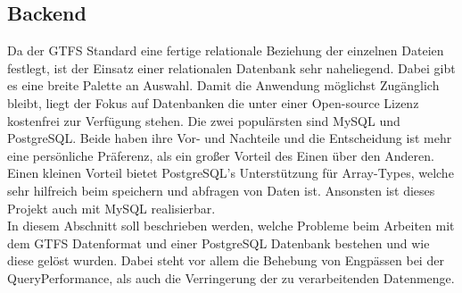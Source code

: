\subsection{Backend}
\label{sub:backend}
  Da der GTFS Standard eine fertige relationale Beziehung der einzelnen Dateien festlegt, ist der Einsatz einer relationalen Datenbank sehr naheliegend. Dabei gibt es eine breite Palette an Auswahl. Damit die Anwendung möglichst Zugänglich bleibt, liegt der Fokus auf Datenbanken die unter einer Open-source Lizenz kostenfrei zur Verfügung stehen. Die zwei populärsten sind MySQL und PostgreSQL\parencite{db_engines}. Beide haben ihre Vor- und Nachteile und die Entscheidung ist mehr eine persönliche Präferenz, als ein großer Vorteil des Einen über den Anderen. Einen kleinen Vorteil bietet PostgreSQL's Unterstützung für Array-Types, welche sehr hilfreich beim speichern und abfragen von Daten ist. Ansonsten ist dieses Projekt auch mit MySQL realisierbar.\\

  In diesem Abschnitt soll beschrieben werden, welche Probleme beim Arbeiten mit dem GTFS Datenformat und einer PostgreSQL Datenbank bestehen und wie diese gelöst wurden. Dabei steht vor allem die Behebung von Engpässen bei der Query\footnotemark Performance, als auch die Verringerung der zu verarbeitenden Datenmenge.

  

  
  
  
  
  
  
